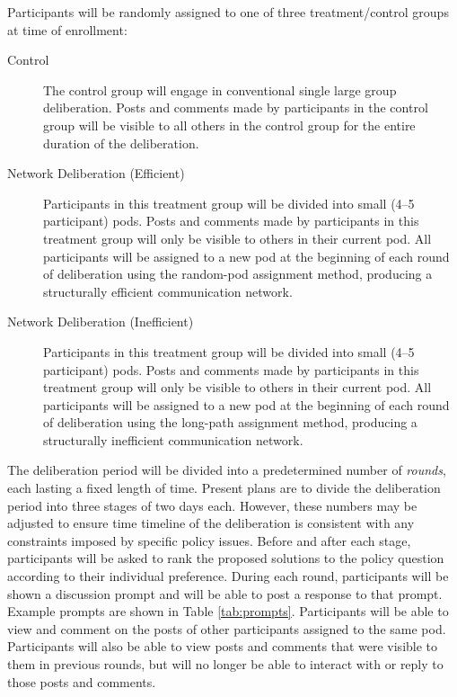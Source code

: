 Participants will be randomly assigned to one of three treatment/control groups
at time of enrollment:
\begin{description}
\item[Control]{
The control group will engage in conventional single large group deliberation.
Posts and comments made by participants in the control group will be visible
to all others in the control group for the entire duration of the deliberation.}
\item[Network Deliberation (Efficient)]{
Participants in this treatment group will be divided into small
(4--5 participant) pods.
Posts and comments made by participants in this treatment group will only be
visible to others in their current pod.
All participants will be assigned to a new pod at the beginning of each round
of deliberation using the random-pod assignment method,
producing a structurally efficient communication network.}
\item[Network Deliberation (Inefficient)]{
Participants in this treatment group will be divided into small
(4--5 participant) pods.
Posts and comments made by participants in this treatment group will only be
visible to others in their current pod.
All participants will be assigned to a new pod at the beginning of each round
of deliberation using the long-path assignment method,
producing a structurally inefficient communication network.}
\end{description}

The deliberation period will be divided into a predetermined number of {\em rounds},
each lasting a fixed length of time.
Present plans are to divide the deliberation period into three stages of two days
each.
However, these numbers may be adjusted to ensure time timeline of the
deliberation is consistent with any constraints imposed by specific policy issues.
Before and after each stage, participants will be asked to rank the proposed
solutions to the policy question according to their individual preference.
During each round, participants will be shown a discussion prompt and will be
able to post a response to that prompt.
Example prompts are shown in Table \ref{tab:prompts}.
Participants will be able to view and comment on the posts of other participants
assigned to the same pod.
Participants will also be able to view posts and comments that were visible to them
in previous rounds, but will no longer be able to interact with or reply to
those posts and comments.

